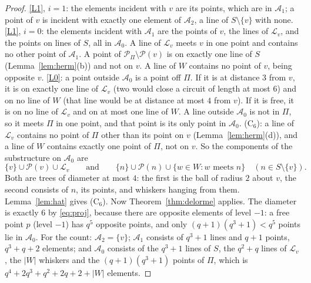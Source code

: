 \documentclass[11pt]{amsart}
\theoremstyle{definition}
\theoremstyle{remark}
\newcommand{\cP}{\mathcal{P}}
\newcommand{\cL}{\mathcal{L}}
\newcommand{\cA}{\mathcal{A}}
\begin{document}
\begin{proof}
\ref{L1}, $i=1$: the elements incident with $v$ are its points, which are in $\cA_1$; a point of $v$ is incident with exactly one element of $\cA_2$, a line of $S\setminus\{v\}$ with none.
\ref{L1}, $i=0$: the elements incident with $\cA_1$ are the points of $v$, the lines of $\cL_v$, and the points on lines of $S$, all in $\cA_0$. A line of $\cL_v$ meets $v$ in one point and contains no other point of $\cA_1$. A point of $\cP_\Pi\setminus\cP(v)$ is on exactly one line of $S$ (Lemma~\ref{lem:herm}(b)) and not on $v$. A line of $W$ contains no point of $v$, being opposite $v$.
\ref{L0}: a point outside $\cA_0$ is a point off $\Pi$. If it is at distance $3$ from $v$, it is on exactly one line of $\cL_v$ (two would close a circuit of length at most $6$) and on no line of $W$ (that line would be at distance at most $4$ from $v$). If it is free, it is on no line of $\cL_v$ and on at most one line of $W$. A line outside $\cA_0$ is not in $\Pi$, so it meets $\Pi$ in one point, and that point is its only point in $\cA_0$.
\textup{(C$_6$)}: a line of $\cL_v$ contains no point of $\Pi$ other than its point on $v$ (Lemma~\ref{lem:herm}(d)), and a line of $W$ contains exactly one point of $\Pi$, not on $v$. So the components of the substructure on $\cA_0$ are
\[
\{v\}\cup\cP(v)\cup\cL_v\qquad\text{and}\qquad \{n\}\cup\cP(n)\cup\{w\in W: w\text{ meets }n\}\quad(n\in S\setminus\{v\}).
\]
Both are trees of diameter at most $4$: the first is the ball of radius $2$ about $v$, the second consists of $n$, its points, and whiskers hanging from them. Lemma~\ref{lem:hat} gives \textup{(C$_6$)}.
Now Theorem~\ref{thm:delorme} applies. The diameter is exactly $6$ by \eqref{eq:proj}, because there are opposite elements of level $-1$: a free point $p$ (level $-1$) has $q^5$ opposite points, and only $(q+1)(q^3+1)<q^5$ points lie in $\cA_0$. For the count: $\cA_2=\{v\}$; $\cA_1$ consists of $q^3+1$ lines and $q+1$ points, $q^3+q+2$ elements; and $\cA_0$ consists of the $q^3+1$ lines of $S$, the $q^2+q$ lines of $\cL_v$, the $|W|$ whiskers and the $(q+1)(q^3+1)$ points of $\Pi$, which is $q^4+2q^3+q^2+2q+2+|W|$ elements.
\end{proof}
\end{document}

